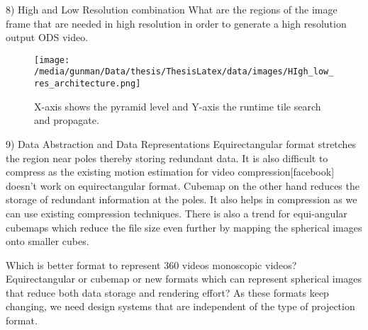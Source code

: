 8) High and Low Resolution combination
What are the regions of the image frame that are needed in high resolution in order to generate a high resolution output ODS video. 
\begin{figure*}
	\begin{center}
		\texttt{[image: /media/gunman/Data/thesis/ThesisLatex/data/images/HIgh\_low\_res\_architecture.png]}
		\caption{X-axis shows the pyramid level and Y-axis the runtime tile search and propagate.}
		\label{fig:ex_4_9}
	\end{center}
	\vspace{-0.3in}
\end{figure*} 
9) Data Abstraction and Data Representations
Equirectangular format stretches the region near poles thereby storing redundant data. It is also difficult to compress as the existing motion estimation for video compression[facebook] doesn’t work on equirectangular format. Cubemap on the other hand reduces the storage of redundant information at the poles. It also helps in compression as we can use existing compression techniques. There is also a trend for equi-angular cubemaps which reduce the file size even further by mapping the spherical images onto smaller cubes.\newline

Which is better format to represent 360 videos monoscopic videos? Equirectangular or cubemap or new formats which can represent spherical images that reduce both data storage and rendering effort? As these formats keep changing, we need design systems that are independent of the type of projection format. \newline






